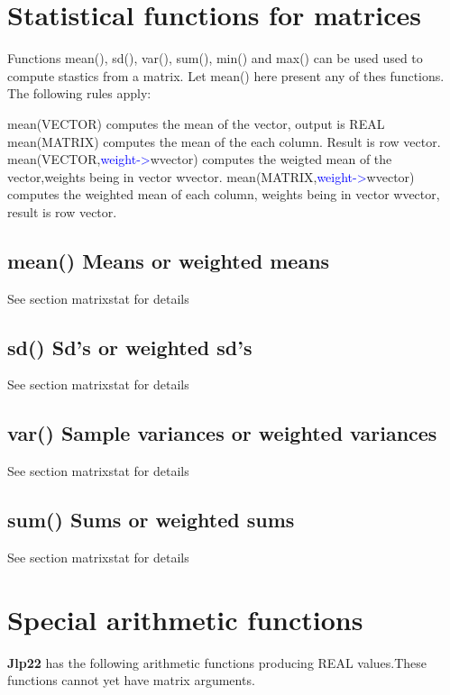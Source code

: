\section{Statistical functions for matrices}
\label{matrixstat}
Functions \textcolor{VioletRed}{mean}(), \textcolor{VioletRed}{sd}(), \textcolor{VioletRed}{var}(), \textcolor{VioletRed}{sum}(), \textcolor{VioletRed}{min}() and \textcolor{VioletRed}{max}()
can be used used to compute stastics from a matrix. Let \textcolor{VioletRed}{mean}() here present
any of thes functions. The following rules apply:
\begin{itemize}
\textcolor{VioletRed}{mean}(VECTOR) computes the mean of the vector, output is REAL
\textcolor{VioletRed}{mean}(MATRIX) computes the mean of the each column. Result is row vector.
\textcolor{VioletRed}{mean}(VECTOR,\textcolor{blue}{weight->}wvector) computes the
weigted mean of the vector,weights being in vector wvector.
\textcolor{VioletRed}{mean}(MATRIX,\textcolor{blue}{weight->}wvector) computes the
weighted mean of each column, weights being in vector wvector, result is row vector.

\end{itemize}
\subsection{\textcolor{VioletRed}{mean}() Means or weighted means}
\label{mean}
See section matrixstat for details
\subsection{\textcolor{VioletRed}{sd}() Sd's or weighted sd's}
\label{sd}
See section matrixstat for details
\subsection{\textcolor{VioletRed}{var}() Sample variances or weighted variances}
\label{var}
See section matrixstat for details
\subsection{\textcolor{VioletRed}{sum}() Sums or weighted sums}
\label{sum}
See section matrixstat for details
\section{Special arithmetic functions}
\label{Special}
\textbf{Jlp22} has the following arithmetic functions producing REAL values.These functions cannot yet have
matrix arguments.
